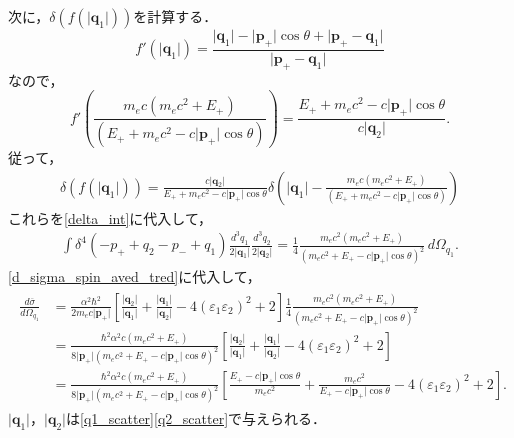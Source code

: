 次に，$\delta(f(\lvert\boldsymbol{q}_1\rvert))$を計算する．
\[ f'(\lvert\boldsymbol{q}_1\rvert) = \frac{\lvert\boldsymbol{q}_1\rvert - \lvert\boldsymbol{p}_+\rvert\cos\theta + \lvert\boldsymbol{p}_+ - \boldsymbol{q}_1\rvert}{\lvert\boldsymbol{p}_+ - \boldsymbol{q}_1\rvert} \]
なので，
\[f'\left( \frac{m_ec(m_ec^2 + E_+)}{(E_+ + m_ec^2 - c\lvert\boldsymbol{p}_+\rvert\cos\theta)} \right) = \frac{E_+ + m_ec^2 - c\lvert\boldsymbol{p}_+\rvert\cos\theta}{c\lvert\boldsymbol{q}_2\rvert}.\]
従って，
\begin{align}
  \delta(f(\lvert\boldsymbol{q}_1\rvert)) = \frac{c\lvert\boldsymbol{q}_2\rvert}{E_+ + m_ec^2 - c\lvert\boldsymbol{p}_+\rvert\cos\theta}\delta\left(\lvert\boldsymbol{q}_1\rvert - \frac{m_ec(m_ec^2 + E_+)}{(E_+ + m_ec^2 - c\lvert\boldsymbol{p}_+\rvert\cos\theta)}\right)
\end{align}
これらを\eqref{delta_int}に代入して，
\begin{align}
  \int\delta^4(-p_+ + q_2 - p_- + q_1) \frac{d^3q_1}{2\lvert\boldsymbol{q}_1\rvert} \frac{d^3q_2}{2\lvert\boldsymbol{q}_2\rvert} = \frac{1}{4}\frac{m_ec^2(m_ec^2 + E_+)}{(m_ec^2 + E_+ - c\lvert\boldsymbol{p}_+\rvert\cos\theta)^2}\,d\Omega_{q_1}.
\end{align}
\eqref{d_sigma_spin_aved_tred}に代入して，
\begin{align}
  \begin{split}
    \frac{d\overline{\sigma}}{d\Omega_{q_1}} &= \frac{\alpha^2\hbar^2}{2m_ec\lvert\boldsymbol{p}_+\rvert}\left[ \frac{\lvert\boldsymbol{q}_2\lvert}{\lvert\boldsymbol{q}_1\lvert} + \frac{\lvert\boldsymbol{q}_1\lvert}{\lvert\boldsymbol{q}_2\lvert} - 4(\varepsilon_1\varepsilon_2)^2 + 2 \right]\frac{1}{4}\frac{m_ec^2(m_ec^2 + E_+)}{(m_ec^2 + E_+ - c\lvert\boldsymbol{p}_+\rvert\cos\theta)^2} \\
    &= \frac{\hbar^2\alpha^2c(m_ec^2 + E_+)}{8\lvert\boldsymbol{p}_+\rvert(m_ec^2 + E_+ - c\lvert\boldsymbol{p}_+\rvert\cos\theta)^2}\left[ \frac{\lvert\boldsymbol{q}_2\lvert}{\lvert\boldsymbol{q}_1\lvert} + \frac{\lvert\boldsymbol{q}_1\lvert}{\lvert\boldsymbol{q}_2\lvert} - 4(\varepsilon_1\varepsilon_2)^2 + 2 \right] \\
    &= \frac{\hbar^2\alpha^2c(m_ec^2 + E_+)}{8\lvert\boldsymbol{p}_+\rvert(m_ec^2 + E_+ - c\lvert\boldsymbol{p}_+\rvert\cos\theta)^2}\left[  \frac{E_+ - c\lvert\boldsymbol{p}_+\rvert\cos\theta}{m_ec^2} + \frac{m_ec^2}{E_+ - c\lvert\boldsymbol{p}_+\rvert\cos\theta} - 4(\varepsilon_1\varepsilon_2)^2 + 2 \right].
  \end{split}
\end{align}
$\lvert\boldsymbol{q}_1\rvert$，$\lvert\boldsymbol{q}_2\rvert$は\eqref{q1_scatter}\eqref{q2_scatter}で与えられる．

